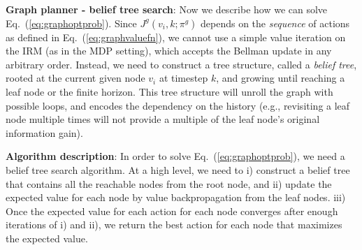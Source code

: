 \documentclass{article}
\newcommand{\ph}[1]{{\textbf{#1}:}} %
\newcommand{\todo}[1]{{\color{red} #1 }} %
\newcommand{\note}[1]{{\color{cyan} NOTE: #1 }}
\begin{document}


\ph{Graph planner - belief tree search}
Now we describe how we can solve Eq.~(\ref{eq:graphoptprob}).
Since $J^g(v_i,k; \pi^g)$ depends on the \textit{sequence} of actions as defined in Eq.~(\ref{eq:graphvaluefn}), we cannot use a simple value iteration on the IRM (as in the MDP setting), which accepts the Bellman update in any arbitrary order.
Instead, we need to construct a tree structure, called a \textit{belief tree}, rooted at the current given node $v_i$ at timestep $k$, and growing until reaching a leaf node or the finite horizon.
%
This tree structure will unroll the graph with possible loops, and encodes the dependency on the history
(e.g., revisiting a leaf node multiple times will not provide a multiple of the leaf node's original information gain).


\ph{Algorithm description}
In order to solve Eq.~(\ref{eq:graphoptprob}), we need a belief tree search algorithm.
At a high level, we need to i) construct a belief tree that contains all the reachable nodes from the root node, and ii) update the expected value for each node by value backpropagation from the leaf nodes.
iii) Once the expected value for each action for each node converges after enough iterations of i) and ii), we return the best action for each node that maximizes the expected value.
\end{document}
